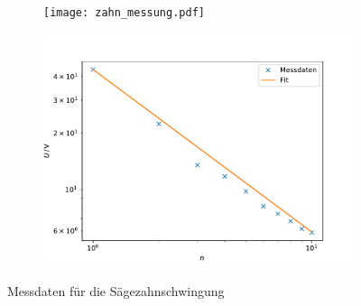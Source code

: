 \begin{figure}[h]
\begin{subfigure}{0.5\textwidth}
    \centering
    \texttt{[image: zahn\_messung.pdf]}
\end{subfigure}
\begin{subfigure}{0.5\textwidth}
    \centering
    \includegraphics[width=\textwidth]{assets/zahn_log.pdf}
\end{subfigure}
\caption{Messdaten für die Sägezahnschwingung}
\label{fig:zahn_fit}
\end{figure}
